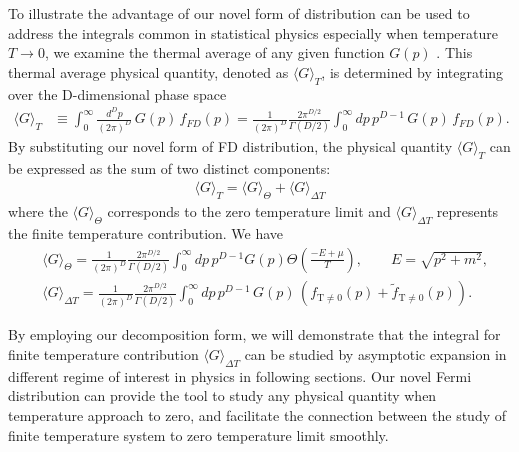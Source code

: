 \documentclass[sn-mathphys,Numbered]{sn-jnl}
\begin{document}
To illustrate the advantage of our novel form of distribution can be used to address the integrals common in statistical physics especially when temperature $T\to0$, we examine the thermal average of any given function $G(p)$ . This thermal average physical quantity, denoted as $\langle G\rangle_T$, is determined by integrating over the D-dimensional phase space 
\begin{align}
\langle G\rangle_T&\equiv\int^{\infty}_{0}\!\!\frac{d^Dp}{(2\pi)^D}\,G(p)\,f_{FD}(p)=\frac{1}{(2\pi)^D}\frac{2\pi^{D/2}}{\Gamma(D/2)}\int^{\infty}_{0}\!\!dp\,p^{D-1}\,G(p)\,f_{FD}(p).
\end{align}
By substituting our novel form of FD distribution, the physical quantity $\langle G\rangle_T$ can be expressed as the sum of two distinct components:
\begin{align}
\langle G\rangle_T=\langle G\rangle_{\Theta}+\langle G\rangle_{\Delta T}
\end{align}
 where the $\langle G\rangle_{\Theta}$ corresponds to the zero temperature limit and $\langle G\rangle_{\Delta T}$ represents the finite temperature contribution. We have
\begin{align}
&\langle G\rangle_{\Theta}=\frac{1}{(2\pi)^D}\frac{2\pi^{D/2}}{\Gamma(D/2)}\int^{\infty}_{0}\!\!dp\,p^{D-1}G(p)\Theta\left(\frac{-E+\mu}{T}\right),\qquad E=\sqrt{p^2+m^2},\\
\label{G_deltaT}
&\langle G\rangle_{\Delta T}=\frac{1}{(2\pi)^D}\frac{2\pi^{D/2}}{\Gamma(D/2)}\int^{\infty}_{0}\!\!dp\,p^{D-1}\,G(p)\,\left(f_\mathrm{T\neq0}(p)+\widetilde f_\mathrm{T\neq0}(p)\right).
\end{align}

By employing our decomposition form, we will demonstrate that the integral for finite temperature contribution $\langle G\rangle_{\Delta T}$ can be studied by asymptotic expansion in different regime of interest in physics in following sections. Our novel Fermi distribution can provide the tool to study any physical quantity when temperature approach to zero, and facilitate the connection between the study of finite temperature system to zero temperature limit smoothly. 

\end{document}
